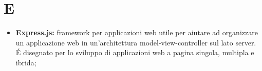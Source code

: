 \section*{\Huge E} %
\label{sec:e}
	\begin{itemize}
		\item \textbf{Express.js:} framework per applicazioni web utile per aiutare ad organizzare un applicazione web in un'architettura model-view-controller sul lato server. É disegnato per lo sviluppo di applicazioni web a pagina singola, multipla e ibrida;
	\end{itemize}
\pagebreak
